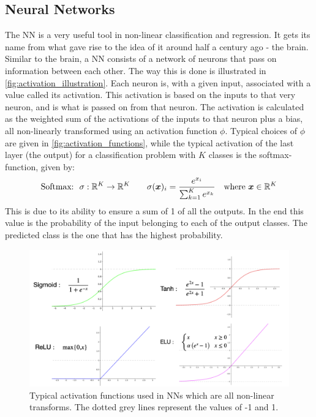 \subsection{Neural Networks}\label{tex:theory_NN}
The NN is a very useful tool in non-linear classification and regression. It gets its name from what gave rise to the idea of it around half a century ago - the brain. Similar to the brain, a NN consists of a network of neurons that pass on information between each other. The way this is done is illustrated in \autoref{fig:activation_illustration}. Each neuron is, with a given input, associated with a value called its activation. This activation is based on the inputs to that very neuron, and is what is passed on from that neuron. The activation is calculated as the weighted sum of the activations of the inputs to that neuron plus a bias, all non-linearly transformed using an activation function $\phi$. Typical choices of $\phi$ are given in \autoref{fig:activation_functions}, while the typical activation of the last layer (the output) for a classification problem with $K$ classes is the softmax-function, given by:
\begin{equation}
\text{Softmax:} \ \ \sigma: \mathbb{R}^K \rightarrow \mathbb{R}^K \qquad \sigma(\boldsymbol{x})_i = \frac{e^{x_i}}{\sum_{k=1}^K e^{x_k}} \quad \text{where} \ \boldsymbol{x} \in \mathbb{R}^K
\end{equation}
This is due to its ability to ensure a sum of 1 of all the outputs. In the end this value is the probability of the input belonging to each of the output classes. The predicted class is the one that has the highest probability.
\begin{figure}
    \centering
    \captionsetup{width=.95\linewidth}
    \includegraphics[width=.7\linewidth]{Pics/02_Theory/activation_functions.png}
    \caption{Typical activation functions used in NNs which are all non-linear transforms. The dotted grey lines represent the values of -1 and 1.}
    \label{fig:activation_functions}
\end{figure}

